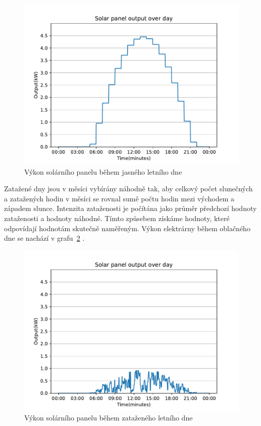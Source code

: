 \documentclass[12pt,a4paper]{Cotmas-2018}
\begin{document}
\begin{figure}
\includegraphics[width=\linewidth]{img/solar_day_clear.pdf}
\caption{Výkon solárního panelu během jasného letního dne}
\label{fig:solar_day_clear}
\end{figure}

Zatažené dny jsou v měsíci vybírány náhodně tak, aby celkový počet slunečných a zatažených hodin v měsíci se rovnal sumě počtu hodin mezi východem a západem slunce. Intenzita zataženosti je počítána jako průměr předchozí hodnoty zataženosti a hodnoty náhodné. Tímto způsebem získáme hodnoty, které odpovídají hodnotám skutečně naměřeným. Výkon elektrárny během oblačného dne se nachází v grafu~\ref{fig:solar_day_cloudy} \cite{Zilvar-2022}.

\begin{figure}
\includegraphics[width=\linewidth]{img/solar_day_cloudy.pdf}
\caption{Výkon solárního panelu během zataženého letního dne}
\label{fig:solar_day_cloudy}
\end{figure}
\end{document}
